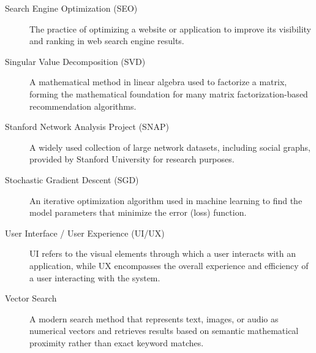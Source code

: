 \documentclass[12pt,a4paper]{report}
\begin{document}
\begin{description}
\item[Search Engine Optimization (SEO)] The practice of optimizing a website or application to improve its visibility and ranking in web search engine results.

\item[Singular Value Decomposition (SVD)] A mathematical method in linear algebra used to factorize a matrix, forming the mathematical foundation for many matrix factorization-based recommendation algorithms.

\item[Stanford Network Analysis Project (SNAP)] A widely used collection of large network datasets, including social graphs, provided by Stanford University for research purposes.

\item[Stochastic Gradient Descent (SGD)] An iterative optimization algorithm used in machine learning to find the model parameters that minimize the error (loss) function.

\item[User Interface / User Experience (UI/UX)] UI refers to the visual elements through which a user interacts with an application, while UX encompasses the overall experience and efficiency of a user interacting with the system.

\item[Vector Search] A modern search method that represents text, images, or audio as numerical vectors and retrieves results based on semantic mathematical proximity rather than exact keyword matches.
\end{description}

\titlespacing*{\chapter}{0pt}{50pt}{40pt}







\end{document}
